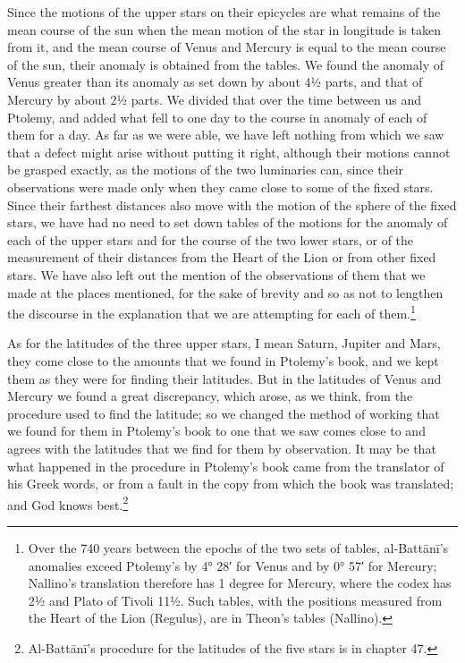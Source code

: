 \documentclass[11pt]{article}
\newcommand{\ArPage}[1]{\marginpar{\footnotesize\color{gray}Ar.\,p.\,#1}}
\begin{document}
\par Since the motions of the upper stars on their epicycles are what remains of the mean course of the sun when the mean motion of the star in longitude is taken from it, and the mean course of Venus and Mercury is equal to the mean course of the sun, their anomaly is obtained from the tables. We found the anomaly of Venus greater than its anomaly as set down by about 4½ parts, and that of Mercury by about 2½ parts. We divided that over the time between us and Ptolemy, and added what fell to one day to the course in anomaly of each of them for a day. As far as we were able, we have left nothing from which we saw that a defect might arise without putting it right, although their motions cannot be grasped exactly, as the motions of the two luminaries can, since their observations were made only when they came close to some of the fixed stars. Since their farthest distances also move with the motion of the sphere of the fixed stars, we have had no need to set down tables of the motions for the anomaly of each of the upper stars and for the course of the two lower stars, or of the measurement of their distances from the Heart of the Lion or from other fixed stars. We have also left out the mention of the observations of them that we made at the places mentioned, for the sake of brevity and so as not to lengthen the discourse in the explanation that we are attempting for each of them.\footnote{Over the 740 years between the epochs of the two sets of tables, al-Battānī's anomalies exceed Ptolemy's by 4° 28′ for Venus and by 0° 57′ for Mercury; Nallino's translation therefore has 1 degree for Mercury, where the codex has 2½ and Plato of Tivoli 11½. Such tables, with the positions measured from the Heart of the Lion (Regulus), are in Theon's tables (Nallino).}\par
\par \ArPage{100}As for the latitudes of the three upper stars, I mean Saturn, Jupiter and Mars, they come close to the amounts that we found in Ptolemy's book, and we kept them as they were for finding their latitudes. But in the latitudes of Venus and Mercury we found a great discrepancy, which arose, as we think, from the procedure used to find the latitude; so we changed the method of working that we found for them in Ptolemy's book to one that we saw comes close to and agrees with the latitudes that we find for them by observation. It may be that what happened in the procedure in Ptolemy's book came from the translator of his Greek words, or from a fault in the copy from which the book was translated; and God knows best.\footnote{Al-Battānī's procedure for the latitudes of the five stars is in chapter 47.}\par
\end{document}
